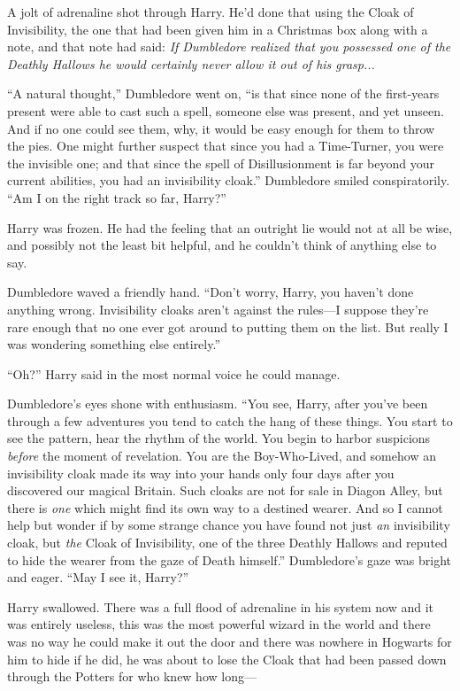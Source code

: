 A jolt of adrenaline shot through Harry. He’d done that using the Cloak of Invisibility, the one that had been given him in a Christmas box along with a note, and that note had said: \emph{If Dumbledore realized that you possessed one of the Deathly Hallows he would certainly never allow it out of his grasp...}

“A natural thought,” Dumbledore went on, “is that since none of the first-years present were able to cast such a spell, someone else was present, and yet unseen. And if no one could see them, why, it would be easy enough for them to throw the pies. One might further suspect that since you had a Time-Turner, you were the invisible one; and that since the spell of Disillusionment is far beyond your current abilities, you had an invisibility cloak.” Dumbledore smiled conspiratorily. “Am I on the right track so far, Harry?”

Harry was frozen. He had the feeling that an outright lie would not at all be wise, and possibly not the least bit helpful, and he couldn’t think of anything else to say.

Dumbledore waved a friendly hand. “Don’t worry, Harry, you haven’t done anything wrong. Invisibility cloaks aren’t against the rules—I suppose they’re rare enough that no one ever got around to putting them on the list. But really I was wondering something else entirely.”

“Oh?” Harry said in the most normal voice he could manage.

Dumbledore’s eyes shone with enthusiasm. “You see, Harry, after you’ve been through a few adventures you tend to catch the hang of these things. You start to see the pattern, hear the rhythm of the world. You begin to harbor suspicions \emph{before} the moment of revelation. You are the Boy-Who-Lived, and somehow an invisibility cloak made its way into your hands only four days after you discovered our magical Britain. Such cloaks are not for sale in Diagon Alley, but there is \emph{one} which might find its own way to a destined wearer. And so I cannot help but wonder if by some strange chance you have found not just \emph{an} invisibility cloak, but \emph{the} Cloak of Invisibility, one of the three Deathly Hallows and reputed to hide the wearer from the gaze of Death himself.” Dumbledore’s gaze was bright and eager. “May I see it, Harry?”

Harry swallowed. There was a full flood of adrenaline in his system now and it was entirely useless, this was the most powerful wizard in the world and there was no way he could make it out the door and there was nowhere in Hogwarts for him to hide if he did, he was about to lose the Cloak that had been passed down through the Potters for who knew how long—

